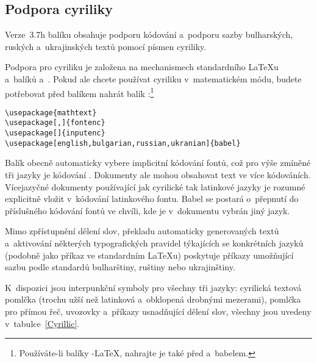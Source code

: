 \subsection{Podpora cyriliky}

Verze~3.7h balíku  obsahuje podporu kódování 
a~podporu sazby bulharských, ruských a~ukrajinských
textů pomocí písmen cyriliky.  

Podpora pro cyriliku je založena na mechanismech standardního \LaTeX u
a~balíků  a~. Pokud ale chcete používat
cyriliku v~matematickém módu, budete potřebovat před balíkem 
nahrát balík :\footnote{Používáte-li balíky \AmS-\LaTeX, 
nahrajte je také před  a~\textsf{babelem}.}

\begin{lscommand}
\verb+\usepackage{mathtext}+\\
\verb+\usepackage[+\verb+,+\verb+]{fontenc}+\\
\verb+\usepackage[+\verb+]{inputenc}+\\
\verb+\usepackage[english,bulgarian,russian,ukranian]{babel}+
\end{lscommand}

Balík  obecně automaticky vybere implicitní kódování fontů,
což pro výše zmíněné tři jazyky je kódování . Dokumenty ale
mohou obsahovat text ve více kódováních. Vícejazyčné dokumenty používající
jak cyrilické tak latinkové jazyky je rozumné explicitně vložit v~kódování
latinkového fontu. \textsf{Babel} se postará o~přepnutí do příslušného kódování
fontů ve chvíli, kde je v~dokumentu vybrán jiný jazyk.

Mimo zpřístupnění dělení slov, překladu automaticky generovaných
textů a~aktivování některých typografických pravidel týkajících se
konkrétních jazyků (podobně jako příkaz  ve standardním
\LaTeX u)  poskytuje příkazy umožňující sazbu
podle standardů bulharštiny, ruštiny nebo ukrajinštiny. 

K~dispozici jsou interpunkční symboly pro všechny tři jazyky: cyrilická
textová pomlčka (trochu užší než latinková a~obklopená drobnými mezerami),
pomlčka pro přímou řeč, uvozovky a~příkazy usnadňující dělení slov,
všechny jsou uvedeny v~tabulce~\ref{Cyrillic}.

